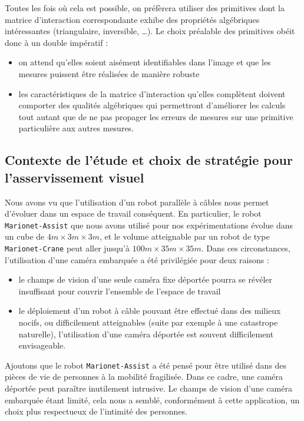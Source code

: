 Toutes les fois où cela est possible, on préfèrera utiliser des primitives dont la matrice d'interaction correspondante exhibe des propriétés algébriques inté\-ressantes (triangulaire, inversible, \dots). Le choix préalable des primitives obéit donc à un double impératif :
\begin{itemize}
 \item on attend qu'elles soient aisément identifiables dans l'image et que les mesures puissent être réalisées de manière robuste
 \item les caractéristiques de la matrice d'interaction qu'elles complètent doivent comporter des qualités algébriques qui permettront d'améliorer les calculs tout autant que de ne pas propager les erreurs de mesures sur une primitive particulière aux autres mesures.
\end{itemize}


\subsection{Contexte de l'étude et choix de stratégie pour l'asser\-vissement visuel}

Nous avons vu que l'utilisation d'un robot parallèle à câbles nous permet d'évoluer dans un espace de travail conséquent. En particulier, le robot {\tt Marionet-Assist} que nous avons utilisé pour nos expérimentations évolue dans un cube de $4m \times 3m \times 3m$, et le volume atteignable par un robot de type {\tt Marionet-Crane} peut aller jusqu'à $100m \times 35m \times 35m$. Dans ces circonstances, l'utilisation d'une caméra embarquée a été privilégiée pour deux raisons :
\begin{itemize}
 \item le champs de vision d'une seule caméra fixe déportée pourra se révéler insuffisant pour couvrir l'ensemble de l'espace de travail
 \item le déploiement d'un robot à câble pouvant être effectué dans des milieux nocifs, ou difficilement atteignables (suite par exemple à une catastrope naturelle), l'utilisation d'une caméra déportée est souvent difficilement envisageable.
\end{itemize}

Ajoutons que le robot {\tt Marionet-Assist} a été pensé pour être utilisé dans des pièces de vie de personnes à la mobilité fragilisée. Dans ce cadre, une caméra déportée peut paraître inutilement intrusive. Le champs de vision d'une caméra embarquée étant limité, cela nous a semblé, conformément à cette application, un choix plus respectueux de l'intimité des personnes. 

